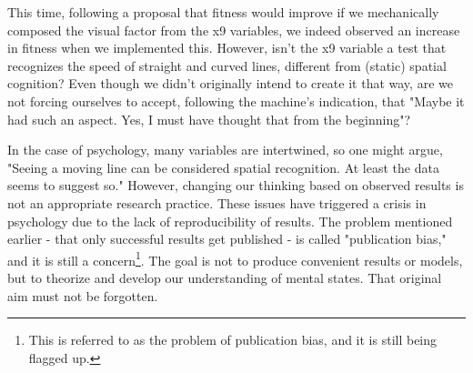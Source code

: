 \documentclass{ltjsbook}
\begin{document}
This time, following a proposal that fitness would improve if we mechanically composed the visual factor from the x9 variables, we indeed observed an increase in fitness when we implemented this. However, isn't the x9 variable a test that recognizes the speed of straight and curved lines, different from (static) spatial cognition? Even though we didn't originally intend to create it that way, are we not forcing ourselves to accept, following the machine's indication, that "Maybe it had such an aspect. Yes, I must have thought that from the beginning"?

In the case of psychology, many variables are intertwined, so one might argue, "Seeing a moving line can be considered spatial recognition. At least the data seems to suggest so." However, changing our thinking based on observed results is not an appropriate research practice. These issues have triggered a crisis in psychology due to the lack of reproducibility of results. The problem mentioned earlier - that only successful results get published - is called "publication bias," and it is still a concern\footnote{This is referred to as the problem of publication bias, and it is still being flagged up.}. The goal is not to produce convenient results or models, but to theorize and develop our understanding of mental states. That original aim must not be forgotten.
\end{document}
